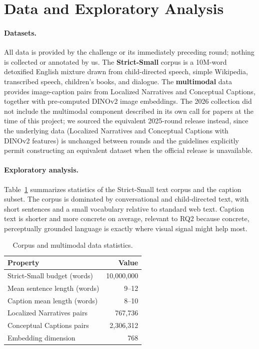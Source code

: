 \documentclass[11pt]{article}
\begin{document}
\section{Data and Exploratory Analysis}
\label{sec:data}
\paragraph{Datasets.} All data is provided by the challenge or its immediately preceding round; nothing is collected or annotated by us. The \textbf{Strict-Small} corpus is a 10M-word detoxified English mixture drawn from child-directed speech, simple Wikipedia, transcribed speech, children's books, and dialogue. The \textbf{multimodal} data provides image-caption pairs from Localized Narratives \citep{pont2020localized} and Conceptual Captions, together with pre-computed DINOv2 image embeddings. The 2026 collection did not include the multimodal component described in its own call for papers at the time of this project; we sourced the equivalent 2025-round release instead, since the underlying data (Localized Narratives and Conceptual Captions with DINOv2 features) is unchanged between rounds and the guidelines explicitly permit constructing an equivalent dataset when the official release is unavailable.

\paragraph{Exploratory analysis.} Table~\ref{tab:eda} summarizes statistics of the Strict-Small text corpus and the caption subset. The corpus is dominated by conversational and child-directed text, with short sentences and a small vocabulary relative to standard web text. Caption text is shorter and more concrete on average, relevant to RQ2 because concrete, perceptually grounded language is exactly where visual signal might help most.

\begin{table}[t]
\centering
\small
\begin{tabular}{lr}
\toprule
\textbf{Property} & \textbf{Value} \\
\midrule
Strict-Small budget (words) & 10{,}000{,}000 \\
Mean sentence length (words) & 9--12 \\
Caption mean length (words) & 8--10 \\
Localized Narratives pairs & 767{,}736 \\
Conceptual Captions pairs & 2{,}306{,}312 \\
Embedding dimension & 768 \\
\bottomrule
\end{tabular}
\caption{Corpus and multimodal data statistics.}
\label{tab:eda}
\end{table}
\end{document}
